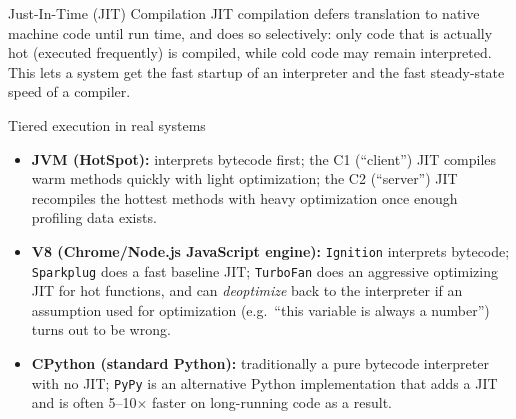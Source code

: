 \documentclass[11pt]{article}
\begin{document}
\begin{defbox}{Just-In-Time (JIT) Compilation}
JIT compilation defers translation to native machine code until run time, and does so
selectively: only code that is actually hot (executed frequently) is compiled, while cold code
may remain interpreted. This lets a system get the fast startup of an interpreter and the fast
steady-state speed of a compiler.
\end{defbox}

\begin{examplebox}{Tiered execution in real systems}
\begin{itemize}
  \item \textbf{JVM (HotSpot):} interprets bytecode first; the C1 (``client'') JIT compiles warm
  methods quickly with light optimization; the C2 (``server'') JIT recompiles the hottest methods
  with heavy optimization once enough profiling data exists.
  \item \textbf{V8 (Chrome/Node.js JavaScript engine):} \texttt{Ignition} interprets bytecode;
  \texttt{Sparkplug} does a fast baseline JIT; \texttt{TurboFan} does an aggressive optimizing
  JIT for hot functions, and can \emph{deoptimize} back to the interpreter if an assumption used
  for optimization (e.g.\ ``this variable is always a number'') turns out to be wrong.
  \item \textbf{CPython (standard Python):} traditionally a pure bytecode interpreter with no
  JIT; \texttt{PyPy} is an alternative Python implementation that adds a JIT and is often
  5--10$\times$ faster on long-running code as a result.
\end{itemize}
\end{examplebox}
\end{document}
